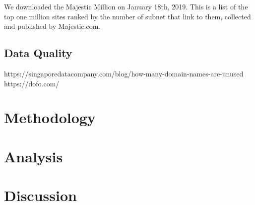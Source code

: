 \documentclass{idc_msc}
\begin{document}
We downloaded the Majestic Million\cite{MajesticMillion} on January 18th, 2019.
This is a list of the top one million sites ranked by the number of subnet that link to them, collected and published by Majestic.com.


\subsection{Data Quality}


https://singaporedatacompany.com/blog/how-many-domain-names-are-unused
https://dofo.com/


\section{Methodology}


\section{Analysis}


\section{Discussion}

\end{document}

